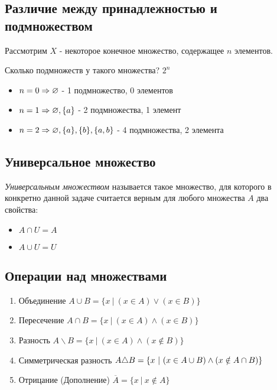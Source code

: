 \subsection{Различие между принадлежностью и подмножеством}
 
Рассмотрим $X$ - некоторое конечное множество, содержащее $n$ элементов.
 
Сколько подмножеств у такого множества? $2^n$
 
\begin{itemize}
     \item $n = 0 \Rightarrow \varnothing$ - 1 подмножество, 0 элементов
     \item $n = 1 \Rightarrow \varnothing, \{a\}$ - 2 подмножества, 1 элемент
     \item $n = 2 \Rightarrow \varnothing, \{a\}, \{b\}, \{a, b\}$ - 4 подмножества, 2 элемента
\end{itemize}
 
\subsection{Универсальное множество}
 
\begin{definition}
    \textit{Универсальным множеством} называется такое множество, для которого в конкретно данной задаче считается верным для любого множества $A$ два свойства:
    \begin{itemize}
        \item $A \cap U = A$
        \item $A \cup U = U$
    \end{itemize}
\end{definition}
 
\subsection{Операции над множествами}
 
%
%
%
%
%
%
\begin{enumerate}
     \item Объединение $A \cup B = \{x\ |\ (x \in A) \vee (x \in B)\}$
     \item Пересечение $A \cap B = \{x\ |\ (x \in A) \wedge (x \in B)\}$
     \item Разность $A \backslash B = \{x\ |\ (x \in A) \wedge (x \notin B)\}$
     \item Симметрическая разность $A \triangle B = \{x\ |\ (x \in A \cup B) \wedge (x \notin A \cap B)\}$
     \item Отрицание (Дополнение) $\overline{A} = \{x\ |\ x \notin A\}$
\end{enumerate}

